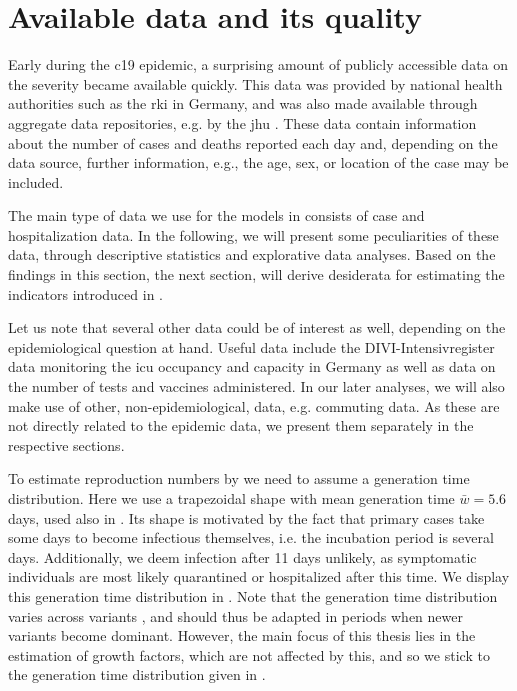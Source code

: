 \section{Available data and its quality}
\label{sec:data}

Early during the \acrshort{c19} epidemic, a surprising amount of publicly accessible data on the severity became available quickly. This data was provided by national health authorities such as the \acrfull{rki} in Germany, and was also made available through aggregate data repositories, e.g. by the \acrfull{jhu} \citep{Dong2020Interactive}. These data contain information about the number of cases and deaths reported each day and, depending on the data source, further information, e.g., the age, sex, or location of the case may be included.

The main type of data we use for the models in  consists of case and hospitalization data. In the following, we will present some peculiarities of these data, through descriptive statistics and explorative data analyses. Based on the findings in this section, the next section,  will derive desiderata for estimating the indicators introduced in .

Let us note that several other data could be of interest as well, depending on the epidemiological question at hand. Useful data include the DIVI-Intensivregister data monitoring the \gls{icu} occupancy and capacity in Germany as well as data on the number of tests and vaccines administered. In our later analyses, we will also make use of other, non-epidemiological, data, e.g. commuting data. As these are not directly related to the epidemic data, we present them separately in the respective sections.

To estimate reproduction numbers by  we need to assume a generation time distribution. Here we use a trapezoidal shape with mean generation time $\bar w = 5.6$ days, used also in \citep{Burgard2021Regional}. Its shape is motivated by the fact that primary cases take some days to become infectious themselves, i.e. the incubation period is several days. Additionally, we deem infection after 11 days unlikely, as symptomatic individuals are most likely quarantined or hospitalized after this time. We display this generation time distribution in . Note that the generation time distribution varies across variants \citep{Hart2022Generationa}, and should thus be adapted in periods when newer variants become dominant. However, the main focus of this thesis lies in the estimation of growth factors, which are not affected by this, and so we stick to the generation time distribution given in .

